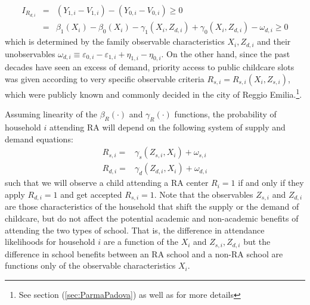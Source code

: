 \documentclass[12pt]{article}
\begin{document}
\begin{eqnarray*}
I_{R_{d,i}} &=&\left(Y_{1,i}-V_{1,i}\right)-\left(Y_{0,i}-V_{0,i}\right) \geq 0 \\

&=&\beta_{1}(X_{i})-\beta_{0}(X_{i})-\gamma_{1}(X_{i},Z_{d,i})+\gamma_{0}(X_{i},Z_{d,i})-\omega_{d,i} \geq 0 
\end{eqnarray*}%
which is determined by the family observable characteristics $X_{i},Z_{d,i}$ and their unobservables $\omega_{d,i} \equiv \varepsilon_{0,i}-\varepsilon_{1,i}+\eta_{1,i}-\eta_{0,i}$. %
On the other hand, since the past decades have seen an excess of demand, priority access to public childcare slots was given according to very specific observable criteria $R_{s,i}=R_{s,i}(X_{i},Z_{s,i})$, which were publicly known and commonly decided in the city of Reggio Emilia.\footnote{See section (\ref{sec:ParmaPadova}) as well as \cite{Brilli2016} for more details}. %

Assuming linearity of the $\beta_{R}(\cdot)$ and $\gamma_{R}(\cdot)$ functions, the probability of household $i$ attending RA will depend on the following system of supply and demand equations:
%
\begin{align}
R_{s,i} = & \gamma_{s} \left( Z_{s,i}, X_{i} \right) + \omega_{s,i}  \label{eq:1stage-supply} \\

R_{d,i} = & \gamma_{d} \left( Z_{d,i}, X_{i} \right) + \omega_{d,i}  \label{eq:1stage-demand} 

%
\end{align}
%
such that we will observe a child attending a RA center $R_{i}=1$ if and only if they apply $R_{d,i}=1$ and get accepted $R_{s,i}=1$.
Note that the observables $Z_{s,i}$ and $Z_{d,i}$ are those characteristics of the household that shift the supply or the demand of childcare, but do not affect the potential academic and non-academic benefits of attending the two types of school. That is, the difference in attendance likelihoods for household $i$ are a function of the $X_{i}$ and $Z_{s,i},Z_{d,i}$ but the difference in school benefits between an RA school and a non-RA school are functions only of the observable characteristics $X_{i}$.
\end{document}
